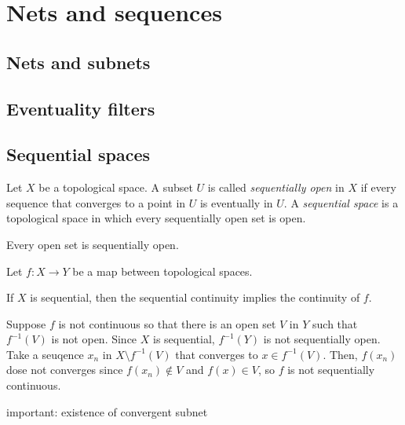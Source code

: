 \documentclass{../../large}
\begin{document}
\chapter{Nets and sequences}
\section{Nets and subnets}
\section{Eventuality filters}
\section{Sequential spaces}



\begin{prb}
Let $X$ be a topological space.
A subset $U$ is called \emph{sequentially open} in $X$ if every sequence that converges to a point in $U$ is eventually in $U$.
A \emph{sequential space} is a topological space in which every sequentially open set is open.
\begin{parts}
\item Every open set is sequentially open.
\item
\end{parts}
\end{prb}

\begin{prb}
Let $f:X\to Y$ be a map between topological spaces.
\begin{parts}
\item If $X$ is sequential, then the sequential continuity implies the continuity of $f$.
\end{parts}
\end{prb}
\begin{pf}
Suppose $f$ is not continuous so that there is an open set $V$ in $Y$ such that $f^{-1}(V)$ is not open.
Since $X$ is sequential, $f^{-1}(Y)$ is not sequentially open.
Take a seuqence $x_n$ in $X\setminus f^{-1}(V)$ that converges to $x\in f^{-1}(V)$.
Then, $f(x_n)$ dose not converges since $f(x_n)\notin V$ and $f(x)\in V$, so $f$ is not sequentially continuous.
\end{pf}

\begin{prb}
\end{prb}


important: existence of convergent subnet
\end{document}
